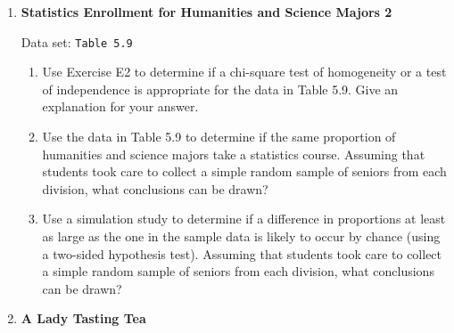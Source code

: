 \documentclass[
]{report}
\begin{document}
\begin{enumerate}
  \begin{enumerate}
    \item Was either the explanatory (row) or the response (column) variable fixed before the study was conducted?
    \item Is this an example of an experiment or an observational study?
    \item Is this a cross-classification, cohort, or case-control study?
    \item Create a segmented bar chart for the data.
    \item Create a simulation study to test the one-sided hypothesis that science majors are more likely to take a statistics course. Provide a \textit{p}-value. Assuming that students took care to collect a simple random sample of seniors from each division, what conclusions can be drawn?
    \item Use Fisher’s exact test to test the one-sided hypothesis that science majors are more likely to take a statistics course. Provide a \textit{p}-value. Assuming that students took care to collect a simple random sample of seniors from each division, what conclusions can be drawn?
  \end{enumerate}

  \item \textbf{Statistics Enrollment for Humanities and Science Majors 2}    

  Data set: \texttt{Table 5.9}   
  \begin{enumerate}
    \item Use Exercise E2 to determine if a chi-square test of homogeneity or a test of independence is appropriate for the data in Table 5.9. Give an explanation for your answer.
    \item Use the data in Table 5.9 to determine if the same proportion of humanities and science majors take a statistics course. Assuming that students took care to collect a simple random sample of seniors from each division, what conclusions can be drawn?
    \item Use a simulation study to determine if a difference in proportions at least as large as the one in the sample data is likely to occur by chance (using a two-sided hypothesis test). Assuming that students took care to collect a simple random sample of seniors from each division, what conclusions can be drawn?
  \end{enumerate}

  \item \textbf{A Lady Tasting Tea}    


\end{enumerate}
\end{document}
